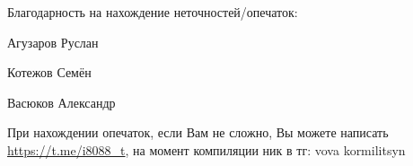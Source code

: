 Благодарность на нахождение неточностей/опечаток:

Агузаров Руслан

Котежов Семён

Васюков Александр

При нахождении опечаток, если Вам не сложно, Вы можете написать \url{https://t.me/i8088_t}, на момент компиляции ник в тг: vova kormilitsyn
